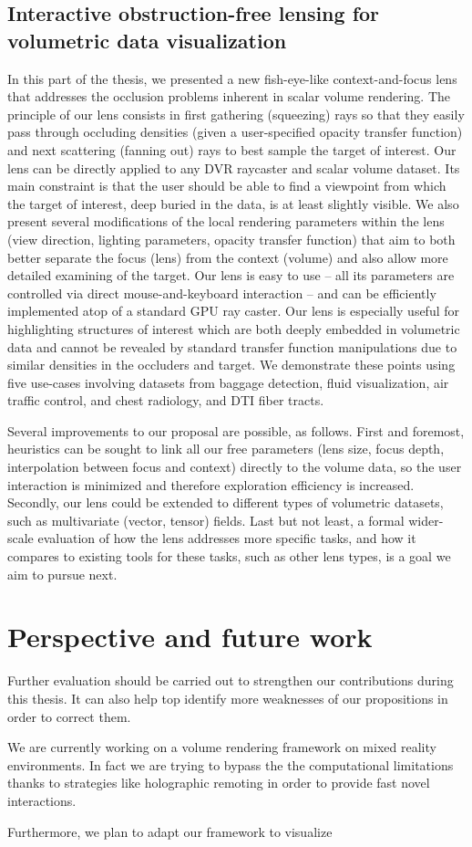 \subsection{Interactive obstruction-free lensing for volumetric data visualization }
In this part of the thesis, we presented a new fish-eye-like context-and-focus lens that addresses the occlusion problems inherent in scalar volume rendering. The principle of our lens consists in first gathering (squeezing) rays so that they easily pass through occluding densities (given a user-specified opacity transfer function) and next scattering (fanning out) rays to best sample the target of interest. Our lens can be directly applied to any DVR raycaster and scalar volume dataset. Its main constraint is that the user should be able to find a viewpoint from which the target of interest, deep buried in the data, is at least slightly visible. We also present several modifications of the local rendering parameters within the lens (view direction, lighting parameters, opacity transfer function) that aim to both better separate the focus (lens) from the context (volume) and also allow more detailed examining of the target. Our lens is easy to use -- all its parameters are controlled via direct mouse-and-keyboard interaction -- and can be efficiently implemented atop of a standard GPU ray caster. Our lens is especially useful for highlighting structures of interest which are both deeply embedded in volumetric data and cannot be revealed by standard transfer function manipulations due to similar densities in the occluders and target. We demonstrate these points using five use-cases involving datasets from baggage detection, fluid visualization, air traffic control, and chest radiology, and DTI fiber tracts.

Several improvements to our proposal are possible, as follows. First and foremost, heuristics can be sought to link all our free parameters (lens size, focus depth, interpolation between focus and context) directly to the volume data, so the user interaction is minimized and therefore exploration efficiency is increased. Secondly, our lens could be extended to different types of volumetric datasets, such as multivariate (vector, tensor) fields. Last but not least, a formal wider-scale evaluation of how the lens addresses more specific tasks, and how it compares to existing tools for these tasks, such as other lens types, is a goal we aim to pursue next.

\section{Perspective and future work}

Further evaluation should be carried out to strengthen our contributions during this thesis. It can also help top identify more weaknesses of our propositions in order to correct them. 

We are currently working on a  volume rendering framework on mixed reality environments.  In fact we are trying to bypass the the computational limitations thanks to strategies like holographic remoting in order to provide fast novel interactions. 

Furthermore, we plan to adapt our framework to visualize